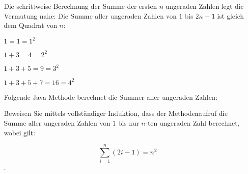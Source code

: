 \documentclass{bschlangaul-aufgabe}
\begin{document}

\let\m=\bInduktionMarkierung
\let\e=\bInduktionErklaerung

Die schrittweise Berechnung der Summe der ersten $n$ ungeraden Zahlen
legt die Vermutung nahe: Die Summe aller ungeraden Zahlen von $1$ bis
$2n-1$ ist gleich dem Quadrat von $n$:

\bigskip

$1 = 1 = 1^2$

$1 + 3 = 4 = 2^2$

$1 + 3 + 5 = 9 = 3^2$

$1 + 3 + 5 + 7 = 16 = 4^2$

\bigskip

\noindent
Folgende Java-Methode berechnet die Summer aller ungeraden Zahlen:


\bigskip

\noindent
Beweisen Sie mittels vollständiger Induktion, dass der
Methodenaufruf  die Summe aller ungeraden Zahlen von
$1$ bis nur $n$-ten ungeraden Zahl berechnet, wobei gilt:

\begin{displaymath}
\sum\limits^n_{i=1} (2i-1) = n^2
\end{displaymath}.
\end{document}

